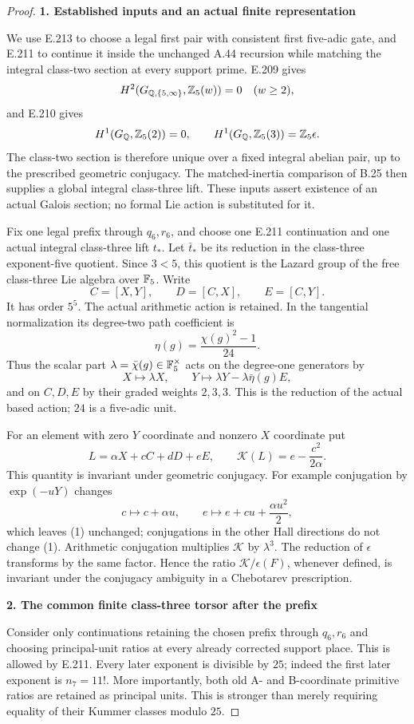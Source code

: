 \begin{proof}
\par\medskip\noindent\textbf{1. Established inputs and an actual finite representation}\par\nobreak\smallskip
We use E.213 to choose a legal first pair with consistent first five-adic gate, and E.211 to continue it inside the unchanged A.44 recursion while matching the integral class-two section at every support prime. E.209 gives
\[
 H^2(G_{\mathbb Q,\{5,\infty\}},\mathbb Z_5(w))=0\quad(w\ge2),
\]
and E.210 gives
\[
 H^1(G_\mathbb Q,\mathbb Z_5(2))=0,\qquad
 H^1(G_\mathbb Q,\mathbb Z_5(3))=\mathbb Z_5\epsilon.
\]
The class-two section is therefore unique over a fixed integral abelian pair, up to the prescribed geometric conjugacy. The matched-inertia comparison of B.25 then supplies a global integral class-three lift. These inputs assert existence of an actual Galois section; no formal Lie action is substituted for it.

Fix one legal prefix through $q_6,r_6$, and choose one E.211 continuation and one actual integral class-three lift $t_*$. Let $\bar t_*$ be its reduction in the class-three exponent-five quotient. Since $3<5$, this quotient is the Lazard group of the free class-three Lie algebra over $\mathbb F_5$. Write
\[
 C=[X,Y],\qquad D=[C,X],\qquad E=[C,Y].
\]
It has order $5^5$. The actual arithmetic action is retained. In the tangential normalization its degree-two path coefficient is
\[
 \eta(g)=\frac{\chi(g)^2-1}{24}.
\]
Thus the scalar part $\lambda=\bar\chi(g)\in\mathbb F_5^\times$ acts on the degree-one generators by
\[
 X\longmapsto\lambda X,\qquad
 Y\longmapsto\lambda Y-\lambda\bar\eta(g)E,
\]
and on $C,D,E$ by their graded weights $2,3,3$. This is the reduction of the actual based action; $24$ is a five-adic unit.

For an element with zero $Y$ coordinate and nonzero $X$ coordinate put
\[
 L=\alpha X+cC+dD+eE,\qquad
 \mathcal K(L)=e-\frac{c^2}{2\alpha}.
 \tag{1}
\]
This quantity is invariant under geometric conjugacy. For example conjugation by $\exp(-uY)$ changes
\[
 c\mapsto c+\alpha u,\qquad
 e\mapsto e+cu+\frac{\alpha u^2}{2},
\]
which leaves (1) unchanged; conjugations in the other Hall directions do not change (1). Arithmetic conjugation multiplies $\mathcal K$ by $\lambda^3$. The reduction of $\epsilon$ transforms by the same factor. Hence the ratio $\mathcal K/\epsilon(F)$, whenever defined, is invariant under the conjugacy ambiguity in a Chebotarev prescription.

\par\medskip\noindent\textbf{2. The common finite class-three torsor after the prefix}\par\nobreak\smallskip
Consider only continuations retaining the chosen prefix through $q_6,r_6$ and choosing principal-unit ratios at every already corrected support place. This is allowed by E.211. Every later exponent is divisible by $25$; indeed the first later exponent is $n_7=11!$. More importantly, both old A- and B-coordinate primitive ratios are retained as principal units. This is stronger than merely requiring equality of their Kummer classes modulo $25$.


\end{proof}
